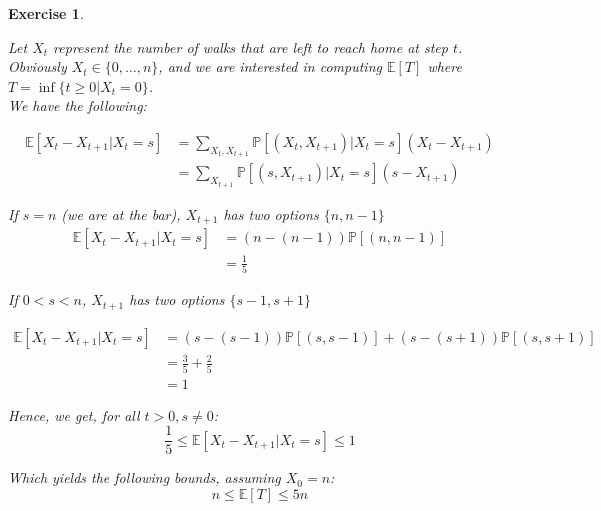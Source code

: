 \documentclass{article}
\newtheorem{exo}{Exercise}
\def\P{\mathbb{P}}
\def\E{\mathbb{E}}
\begin{document}
\begin{exo}{\ \\}

Let $X_t$ represent the number of walks that are left to reach home at step $t$. Obviously $X_t \in \{0, \dots, n\}$, and we are interested in computing $\E[T]$ where $T = \inf\{t \geq 0 | X_t = 0 \}$. \\

We have the following:

\begin{align*}
    \E[X_t - X_{t+1}| X_t=s]  
    &= \sum_{X_t, X_{t+1}} \P[(X_t, X_{t+1})|X_t=s](X_t-X_{t+1}) \\
    &= \sum_{X_{t+1}} \P[(s,X_{t+1})|X_t=s](s-X_{t+1})
\end{align*}

If $s=n$ (we are at the bar), $X_{t+1}$ has two options $\{n, n-1\}$
\begin{align*}
    \E[X_t-X_{t+1} | X_t = s] &= (n - (n-1))\P[(n, n-1)] \\
                               &= \frac{1}{5}
\end{align*}


If $0<s<n$, $X_{t+1}$ has two options $\{s-1, s+1\}$

\begin{align*}
    \E[X_t-X_{t+1} | X_t = s] 
    &= (s - (s-1))\P[(s, s-1)] + (s-(s+1))\P[(s, s+1)] \\
    &= \frac{3}{5} + \frac{2}{5} \\
    &= 1
\end{align*}

Hence, we get, for all $t>0, s \neq 0$:
\[ \frac{1}{5} \leq \E[X_t-X_{t+1} | X_t = s]  \leq 1 \]

Which yields the following bounds, assuming $X_0 = n$:
\[ n \leq \E[T] \leq 5n \]
\end{exo}
\end{document}
